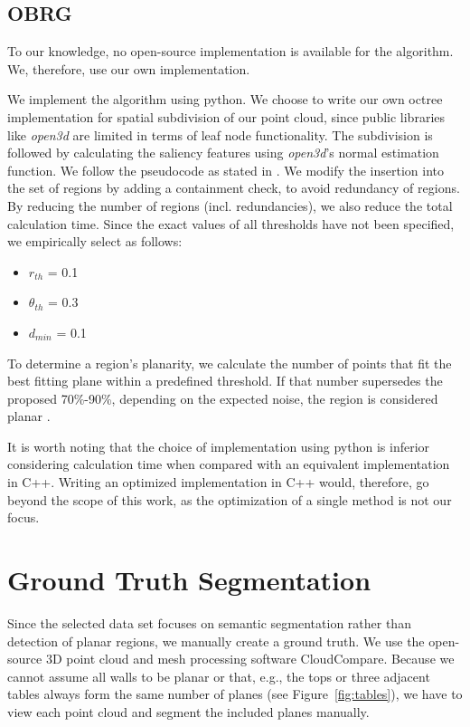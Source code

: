 \documentclass[main.tex]{subfiles}
\begin{document}
\subsection*{OBRG}
To our knowledge, no open-source implementation is available for the algorithm.
We, therefore, use our own implementation.

We implement the algorithm using python. We choose to write our own octree implementation for spatial subdivision of our point cloud, since
public libraries like \textit{open3d} are limited in terms of leaf node functionality.
The subdivision is followed by calculating the saliency features using \textit{open3d}'s normal estimation function.
We follow the pseudocode as stated in \cite[Algorithm~1]{Vo_Truong-Hong_Laefer_Bertolotto_2015}. We modify the insertion into the set
of regions by adding a containment check, to avoid redundancy of regions. By reducing the number of regions (incl. redundancies), we also
reduce the total calculation time.
Since the exact values of all thresholds have not been specified, we empirically select as follows:

\begin{itemize}
    \item $r_{th}$ = 0.1 
    \item $\theta_{th}$ = 0.3
    \item $d_{min}$ =  0.1
\end{itemize}

To determine a region's planarity, we calculate the number of points that fit the best fitting plane within a predefined threshold. 
If that number supersedes the proposed 70\%-90\%, depending on the expected noise, the region is considered planar \cite[Section~3.4]{Vo_Truong-Hong_Laefer_Bertolotto_2015}.

It is worth noting that the choice of implementation using python is inferior considering calculation time when compared with an equivalent implementation in C++. Writing an optimized implementation in C++ would, therefore, go beyond the scope of this work, as the optimization of
a single method is not our focus. 

\section{Ground Truth Segmentation}

Since the selected data set focuses on semantic segmentation rather than detection of planar regions, we manually create a ground truth.
We use the open-source 3D point cloud and mesh processing software CloudCompare.
Because we cannot assume all walls to be planar or that, e.g., the tops or three adjacent tables always form the same number of planes (see Figure~\ref{fig:tables}), we 
have to view each point cloud and segment the included planes manually.
\end{document}
